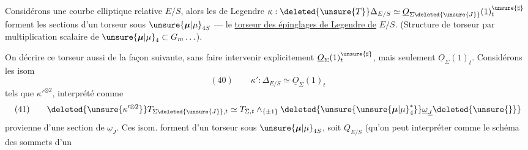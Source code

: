 
Considérons une courbe elliptique relative $E/S$, alors les  de Legendre $\kappa:\deleted{\unsure{T}}\Delta_{E/S}\simeq\underline{O}_{\Sigma\deleted{\unsure{J}}}(1)_t^{\unsure{\sharp}}$ forment les sections d'un torseur sous $\unsure{\boldsymbol{\mu}|\mu}_{4S}$ --- le \uline{torseur des épinglages de Legendre de} $E/S$. (Structure de torseur par multiplication scalaire de $\unsure{\boldsymbol{\mu}|\mu}_4\subset G_m\ldots$).

On  décrire ce torseur aussi de la façon suivante, sans faire intervenir explicitement $\underline{O}_{\Sigma}(1)_t^{\unsure{\sharp}}$, mais seulement $\underline{O}_{\Sigma}(1)_t$. Considérons les isom
\[
(40)\qquad \kappa':\Delta_{E/S}\simeq\underline{O}_{\Sigma}(1)_t
\]
tels que $\kappa'^{\otimes2}$, interprété comme
\[
(41)\qquad \deleted{\unsure{\kappa'^{\otimes2}}}T_{\Sigma\deleted{\unsure{J}},t}\simeq T_{\Sigma,t}\wedge_{\{\pm1\}}\deleted{\unsure{\unsure{\boldsymbol{\mu}|\mu}_4^*}}\underline{\omega}_{\underline{J}}\deleted{\unsure{\}}}
\]
provienne d'une section de $\underline{\omega}_{\underline{J}}$. Ces isom. forment  d'un torseur sous $\unsure{\boldsymbol{\mu}|\mu}_{4S}$, soit $Q_{E/S}$ (qu'on peut interpréter comme le schéma des sommets d'un
